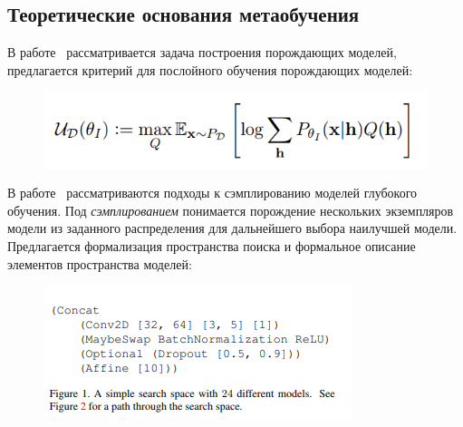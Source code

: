 \documentclass{article}
\begin{document}
\subsection{Теоретические основания метаобучения }
В работе~\cite{layerwise_optimal} рассматривается задача построения порождающих моделей, предлагается критерий для послойного обучения порождающих моделей:
\begin{figure}[H]
\includegraphics[width=\textwidth]{./arch_review_figs/mub.png}
\end{figure}

В работе~\cite{search_space} рассматриваются подходы к сэмплированию моделей глубокого обучения. Под \textit{сэмплированием} понимается порождение нескольких экземпляров модели из заданного распределения для дальнейшего выбора наилучшей модели. Предлагается формализация пространства поиска и формальное описание элементов  пространства моделей:
 \begin{figure}[H]
\includegraphics[width=\textwidth]{./arch_review_figs/search_space.png}
\end{figure}
\end{document}

